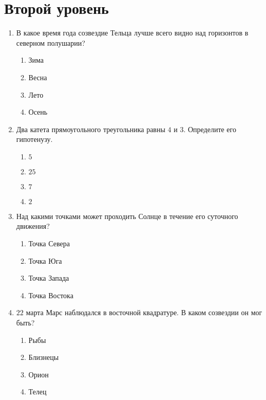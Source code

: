 \documentclass[12pt]{article}
\begin{document}
\section*{Второй уровень}
\begin{enumerate}[resume]
	\item В какое время года созвездие Тельца лучше всего видно над горизонтов в северном полушарии?
	\begin{multicols}{2}
		\begin{enumerate}[label=\textbf{\Alph*.}]
			\item{Зима} \item{Весна}
			\item{Лето} \item{Осень} 
		\end{enumerate}	
	\end{multicols}

	\newpage

	\item Два катета прямоугольного треугольника равны $4$ и $3$. Определите его гипотенузу. 
	\begin{multicols}{2}
		\begin{enumerate}[label=\textbf{\Alph*.}]
			\item{$5$} \item{$25$}
			\item{$7$} \item{$2$} 
		\end{enumerate}	
	\end{multicols}

	\item Над какими точками может проходить Солнце в течение его суточного движения?
	\begin{multicols}{2}
		\begin{enumerate}[label=\textbf{\Alph*.}]
			\item{Точка Севера} \item{Точка Юга}
			\item{Точка Запада} \item{Точка Востока} 
		\end{enumerate}	
	\end{multicols}

	\item $22$ марта Марс наблюдался в восточной квадратуре. В каком созвездии он мог быть?
	\begin{multicols}{2}
		\begin{enumerate}[label=\textbf{\Alph*.}]
			\item{Рыбы} \item{Близнецы}
			\item{Орион} \item{Телец} 
		\end{enumerate}	
	\end{multicols}


\end{enumerate}
\end{document}
